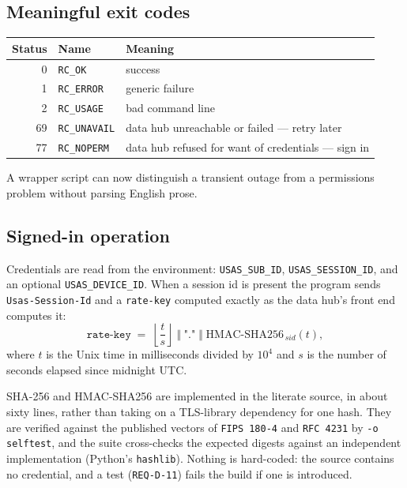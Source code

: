 \documentclass[11pt]{article}
\newcommand{\code}[1]{\texttt{#1}}
\newcommand{\req}[1]{\texttt{#1}}
\begin{document}
\subsection{Meaningful exit codes}

\begin{center}
\begin{tabular}{rll}
\toprule
\textbf{Status} & \textbf{Name} & \textbf{Meaning} \\
\midrule
0  & \code{RC\_OK}      & success \\
1  & \code{RC\_ERROR}   & generic failure \\
2  & \code{RC\_USAGE}   & bad command line \\
69 & \code{RC\_UNAVAIL} & data hub unreachable or failed --- retry later \\
77 & \code{RC\_NOPERM}  & data hub refused for want of credentials --- sign in \\
\bottomrule
\end{tabular}
\end{center}

\noindent A wrapper script can now distinguish a transient outage from
a permissions problem without parsing English prose.

\subsection{Signed-in operation}

Credentials are read from the environment: \code{USAS\_SUB\_ID},
\code{USAS\_SESSION\_ID}, and an optional \code{USAS\_DEVICE\_ID}.
When a session id is present the program sends \code{Usas-Session-Id}
and a \code{rate-key} computed exactly as the data hub's front end
computes it:
\[
  \texttt{rate-key} \;=\;
  \left\lfloor \frac{t}{s} \right\rfloor \;\Vert\; \texttt{"."} \;\Vert\;
  \mathrm{HMAC\mbox{-}SHA256}_{\,\mathit{sid}}(t),
\]
where $t$ is the Unix time in milliseconds divided by $10^{4}$ and $s$
is the number of seconds elapsed since midnight UTC.

SHA-256 and HMAC-SHA256 are implemented in the literate source, in
about sixty lines, rather than taking on a TLS-library dependency for
one hash.  They are verified against the published vectors of
\code{FIPS 180-4} and \code{RFC 4231} by \code{-o selftest}, and the
suite cross-checks the expected digests against an independent
implementation (Python's \code{hashlib}).  Nothing is hard-coded: the
source contains no credential, and a test
(\req{REQ-D-11}) fails the build if one is introduced.
\end{document}
